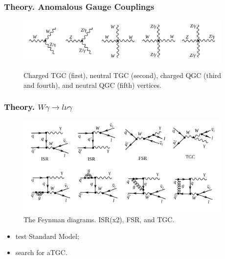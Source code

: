 \begin{frame}\frametitle{Theory. Anomalous Gauge Couplings}

\begin{figure}[htb]
  \begin{center}
    {\includegraphics[width=0.95\textwidth]{../figs/WgAbout/TGC_and_QGC_vertices.png}}
    \caption\tiny{Charged TGC (first), neutral TGC (second), charged QGC (third and fourth), and neutral QGC (fifth) vertices.}
    \label{fig:TGC_and_QGC_vertices}
  \end{center}
\end{figure}

\end{frame}%

\begin{frame}\frametitle{Theory. $W\gamma\rightarrow l\nu\gamma$}

   \begin{figure}[htb]
      \begin{center}
        \scriptsize
          \includegraphics[width=0.95\textwidth]{../figs/WgAbout/feynmWg_LO_NLO.png}
          \caption{\scriptsize{The Feynman diagrams. ISR(x2), FSR, and TGC.}}
       \end{center}
    \end{figure}

\begin{itemize}
\item test Standard Model;
\item search for aTGC.
\end{itemize}
\end{frame}%
